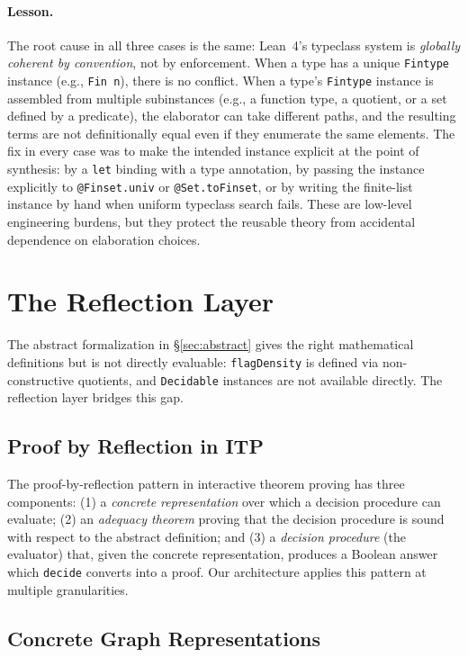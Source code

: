 \documentclass{article}
\newcommand{\lean}[1]{\texttt{#1}}
\begin{document}
\paragraph{Lesson.}
The root cause in all three cases is the same: Lean~4's typeclass system is
\emph{globally coherent by convention}, not by enforcement.  When a type has
a unique \lean{Fintype} instance (e.g., \lean{Fin n}), there is no conflict.
When a type's \lean{Fintype} instance is assembled from multiple subinstances
(e.g., a function type, a quotient, or a set defined by a predicate), the
elaborator can take different paths, and the resulting terms are not
definitionally equal even if they enumerate the same elements.  The fix in
every case was to make the intended instance explicit at the point of
synthesis: by a \lean{let} binding with a type annotation, by passing the
instance explicitly to \lean{@Finset.univ} or \lean{@Set.toFinset}, or by
writing the finite-list instance by hand when uniform typeclass search fails.
These are low-level engineering burdens, but they protect the reusable theory
from accidental dependence on elaboration choices.


\section{The Reflection Layer}
\label{sec:reflection}

The abstract formalization in \S\ref{sec:abstract} gives the right mathematical
definitions but is not directly evaluable: \lean{flagDensity} is defined via
non-constructive quotients, and \lean{Decidable} instances are not available
directly.  The reflection layer bridges this gap.

\subsection{Proof by Reflection in ITP}

The proof-by-reflection pattern in interactive theorem proving has three
components: (1) a \emph{concrete representation} over which a decision
procedure can evaluate; (2) an \emph{adequacy theorem} proving that the
decision procedure is sound with respect to the abstract definition; and (3)
a \emph{decision procedure} (the evaluator) that, given the concrete representation,
produces a Boolean answer which \lean{decide} converts into a proof.  Our
architecture applies this pattern at multiple granularities.

\subsection{Concrete Graph Representations}
\end{document}
